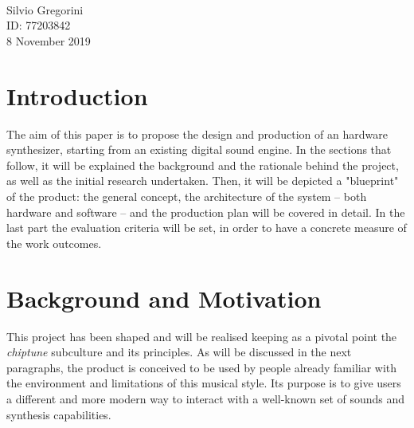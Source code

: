 \documentclass[]{article}
\author{Silvio Gregorini}
\title{}
\date{2019}
\begin{document}
\begin{titlepage}
    
    \vfill
    \\[10pt]
    \hspace*{-1cm}{\Large  Assignment 1 - Project Proposal}\\[8pt]
    \hspace*{-1cm}{\large Interfaces and Interactivity - 31419 - AUT - 201820}\\
\vskip12cm
\hspace*{\fill} {\Large Silvio Gregorini}\\[4pt]
\hspace*{\fill} {\large ID: 77203842}\\[4pt]
\hspace*{\fill} {\large 8 November 2019}
    \vfill
    \vfill
    \vfill
\end{titlepage}

\tableofcontents
\pagebreak
\section{Introduction} %

    The aim of this paper is to propose the design and production of an 
    hardware synthesizer, starting from an existing digital sound engine.
    In the sections that follow, it will be explained the background and the rationale 
    behind the project, as well as the initial research undertaken.
    Then, it will be depicted a "blueprint" of the product: the general concept, the 
    architecture of the system -- both hardware and software -- and the production plan 
    will be covered in detail.
    In the last part the evaluation criteria will be set, in order to have a concrete measure
    of the work outcomes.

\section{Background and Motivation}

    This project has been shaped and will be realised keeping as a pivotal point the
    \emph{chiptune} subculture and its principles. As will be discussed in the next paragraphs,
    the product is conceived to be used by people already familiar with the environment and 
    limitations of this musical style. Its purpose is to give users a different and more 
    modern way to interact with a well-known set of sounds and synthesis capabilities.
\end{document}
